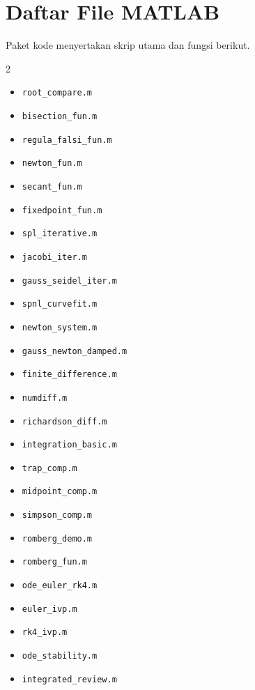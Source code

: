 \documentclass[book,english,noindex,lean,nobackpage,nocopyright,noupdate,nofiglist,notablist]{enacom}
\begin{document}
\chapter*{Daftar File MATLAB}
Paket kode menyertakan skrip utama dan fungsi berikut.
\begin{multicols}{2}
\begin{itemize}
\item \texttt{root\_compare.m}
\item \texttt{bisection\_fun.m}
\item \texttt{regula\_falsi\_fun.m}
\item \texttt{newton\_fun.m}
\item \texttt{secant\_fun.m}
\item \texttt{fixedpoint\_fun.m}
\item \texttt{spl\_iterative.m}
\item \texttt{jacobi\_iter.m}
\item \texttt{gauss\_seidel\_iter.m}
\item \texttt{spnl\_curvefit.m}
\item \texttt{newton\_system.m}
\item \texttt{gauss\_newton\_damped.m}
\item \texttt{finite\_difference.m}
\item \texttt{numdiff.m}
\item \texttt{richardson\_diff.m}
\item \texttt{integration\_basic.m}
\item \texttt{trap\_comp.m}
\item \texttt{midpoint\_comp.m}
\item \texttt{simpson\_comp.m}
\item \texttt{romberg\_demo.m}
\item \texttt{romberg\_fun.m}
\item \texttt{ode\_euler\_rk4.m}
\item \texttt{euler\_ivp.m}
\item \texttt{rk4\_ivp.m}
\item \texttt{ode\_stability.m}
\item \texttt{integrated\_review.m}
\end{itemize}
\end{multicols}
\end{document}
